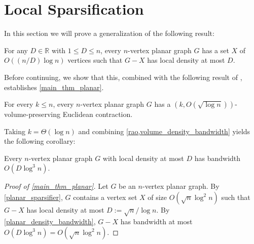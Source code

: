 \documentclass{patmorin}
\renewcommand{\ge}{\geqslant}
\renewcommand{\le}{\leqslant}
\renewcommand{\leq}{\leqslant}
\newcommand{\pat}[1]{\textcolor{Maroon}{Pat: #1}}
\begin{document}
\section{Local Sparsification}
\label{local_sparsification_section}

In this section we will prove a generalization of the following result:

\begin{lem}\label{planar_sparsifier}
  For any $D\in\mathbb{R}$ with $1\leq D\leq n$, every $n$-vertex planar graph $G$ has a set $X$ of $O((n/D)\log n)$ vertices such that $G-X$ has local density at most $D$.
\end{lem}

Before continuing, we show that this, combined with the following result of \citet{rao:small}, establishes \cref{main_thm_planar}.

\begin{thm}\label{rao}
  For every $k\le n$, every $n$-vertex planar graph $G$ has a $(k,O(\sqrt{\log n}))$-volume-preserving Euclidean contraction.
\end{thm}

Taking $k=\Theta(\log n)$ and combining \cref{rao,volume_density_bandwidth} yields the following corollary:

\begin{cor}\label{planar_density_bandwidth}
  Every $n$-vertex planar graph $G$ with local density at most $D$ has bandwidth $O(D\log^{3} n)$.
\end{cor}


\begin{proof}[Proof of \cref{main_thm_planar}]
  Let $G$ be an $n$-vertex planar graph.  By \cref{planar_sparsifier}, $G$ contains a vertex set $X$ of size $O(\sqrt{n}\log^2 n)$ such that $G-X$ has local density at most $D:=\sqrt{n}/\log n$.  By \cref{planar_density_bandwidth}, $G-X$ has bandwidth at most $O(D\log^{3} n)=O(\sqrt{n}\log^2 n)$.
\end{proof}

\end{document}
